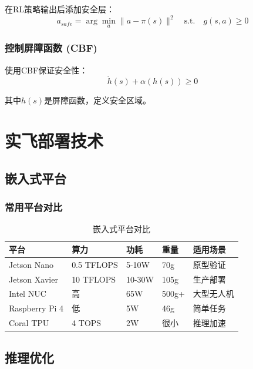 \documentclass[12pt,a4paper]{ctexart}
\begin{document}
在RL策略输出后添加安全层：
\begin{equation}
a_{safe} = \arg\min_a \|a - \pi(s)\|^2 \quad \text{s.t.} \quad g(s,a) \geq 0
\end{equation}

\subsubsection{控制屏障函数 (CBF)}

使用CBF保证安全性：
\begin{equation}
\dot{h}(s) + \alpha(h(s)) \geq 0
\end{equation}

其中$h(s)$是屏障函数，定义安全区域。

\section{实飞部署技术}\label{sec:deployment}

\subsection{嵌入式平台}

\subsubsection{常用平台对比}

\begin{table}[htbp]
\centering
\caption{嵌入式平台对比}\label{tab:embedded}
\begin{tabular}{@{}lllll@{}}
\toprule
\textbf{平台} & \textbf{算力} & \textbf{功耗} & \textbf{重量} & \textbf{适用场景} \\
\midrule
Jetson Nano & 0.5 TFLOPS & 5-10W & 70g & 原型验证 \\
Jetson Xavier & 10 TFLOPS & 10-30W & 105g & 生产部署 \\
Intel NUC & 高 & 65W & 500g+ & 大型无人机 \\
Raspberry Pi 4 & 低 & 5W & 46g & 简单任务 \\
Coral TPU & 4 TOPS & 2W & 很小 & 推理加速 \\
\bottomrule
\end{tabular}
\end{table}

\subsection{推理优化}
\end{document}
